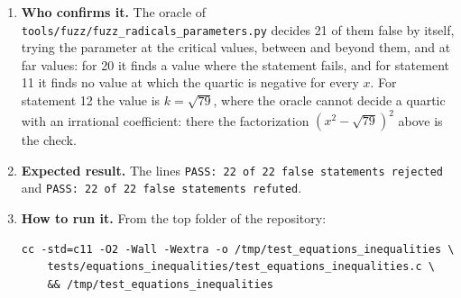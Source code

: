 \documentclass[11pt,a4paper]{article}
\begin{document}
\begin{enumerate}
\item \textbf{Who confirms it.} The oracle of \texttt{tools/fuzz/fuzz\_radicals\_parameters.py} decides 21 of them false by itself, trying the parameter at the critical values, between and beyond them, and at far values: for 20 it finds a value where the statement fails, and for statement 11 it finds no value at which the quartic is negative for every $x$. For statement 12 the value is $k = \sqrt{79}$, where the oracle cannot decide a quartic with an irrational coefficient: there the factorization $(x^{2} - \sqrt{79})^{2}$ above is the check.

\item \textbf{Expected result.} The lines \texttt{PASS: 22 of 22 false statements rejected} and \texttt{PASS: 22 of 22 false statements refuted}.

\item \textbf{How to run it.} From the top folder of the repository:
\begin{verbatim}
cc -std=c11 -O2 -Wall -Wextra -o /tmp/test_equations_inequalities \
    tests/equations_inequalities/test_equations_inequalities.c \
    && /tmp/test_equations_inequalities
\end{verbatim}
\end{enumerate}
\end{document}
